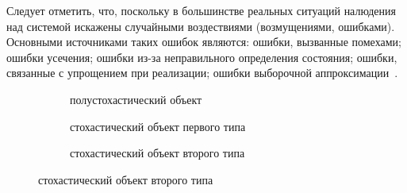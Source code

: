 Следует отметить, что, поскольку в большинстве реальных ситуаций налюдения над
системой искажены случайными воздествиями (возмущениями, ошибками).
Основными источниками таких ошибок являются:
ошибки, вызванные помехами;
ошибки усечения;
ошибки из-за неправильного определения состояния;
ошибки, связанные с упрощением при реализации;
ошибки выборочной аппроксимации~\cite{eikhoff_1975}.

\begin{figure}[p]
  \begin{subfigure}[b]{\linewidth}
    \centering
    \caption{полустохастический объект}\label{fig:type_half}
  \end{subfigure}

  \vspace{2\baselineskip}
  \begin{subfigure}[b]{\linewidth}
    \centering
    \caption{стохастический объект первого типа}\label{fig:type_first}
  \end{subfigure}

  \vspace{2\baselineskip}
  \begin{subfigure}[b]{\linewidth}
    \centering
    \caption{стохастический объект второго типа}\label{fig:type_second}
  \end{subfigure}


\end{figure}

